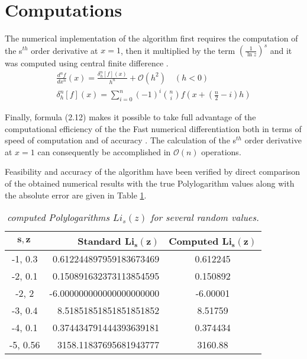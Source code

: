\documentclass{amsart}
\numberwithin{equation}{section}
\begin{document}
\section{Computations}


The numerical implementation of the algorithm first requires the computation of the s$^{th}$ order derivative at $x=1$, then it multiplied by the term $(\frac{1}{\ln{z}})^s$ and it was computed using central finite difference \cite{comp} \cite{cent}.
\begin{align}
    \frac{d^nf}{dx^n}(x)=\frac{\delta^{n}_{h}[f](x)}{h^n}+\mathcal{O}(h^2)\quad (h<0)\\
    \delta^{n}_{h}[f](x)=\sum^n_{i=0}(-1)^i\binom{n}{i}f(x+(\frac{n}{2}-i)h)
\end{align}

Finally, formula (2.12) makes it possible to take full advantage of the computational efficiency of the 
the Fast numerical differentiation both in terms of speed of computation and of accuracy \cite{comp}. 
The calculation of the s$^{th}$ order derivative at $x=1$ can consequently be accomplished 
in $\mathcal{O}(n)$ operations.


Feasibility and accuracy of the algorithm have been verified by direct comparison 
of the obtained numerical results with the true Polylogarithm
values along with the absolute error are given
in Table \ref{tab:1}.
\begin{table}[p]
\caption{\label{tab:1} \it computed Polylogarithms $Li_s(z)$ for several random values.}

\begin{tabular}{|c|r|c|}    
\hline
\rule{0pt}{4ex} $\boldsymbol{s, z\,}$ 
& \bf Standard $\boldsymbol{Li_{s}(z)}$ \hspace{0.6cm} & \bf Computed $\boldsymbol{Li_{s}(z)}$ \\[+5pt]
\hline\rule{0pt}{3ex}
-1, 0.3  & 0.612244897959183673469 & 0.612245 \\[+5pt]
-2, 0.1  & 0.150891632373113854595 & 0.150892 \\[+5pt]
-2, 2    &-6.000000000000000000000 & -6.00001\\[+5pt] 
-3, 0.4   & 8.51851851851851851852 & 8.51759 \\[+5pt]
-4, 0.1  &0.374434791444393639181 & 0.374434 \\[+5pt]
-5, 0.56 & 3158.11837695681943777 & 3160.88 \\[+5pt]


\hline
\end{tabular} 
\end{table}
\end{document}
